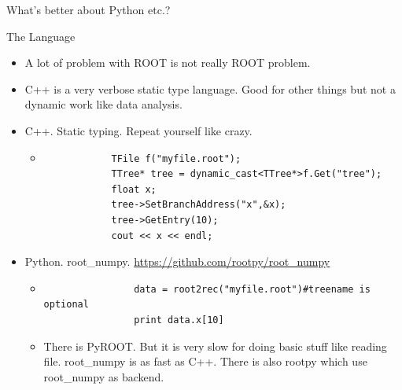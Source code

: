 \documentclass{beamer}
\begin{document}
\begin{frame}[c]
		\centerline{\Large What's better about Python etc.?}
\end{frame}

\begin{frame}[fragile]{The Language}
	\begin{itemize}
	\item A lot of problem with ROOT is not really ROOT problem.
	\item C++ is a very verbose static type language. Good for other things but not a dynamic work like data analysis.
	\item C++. Static typing. Repeat yourself like crazy.
		\begin{itemize}
		\item
		\begin{verbatim}
			TFile f("myfile.root");
			TTree* tree = dynamic_cast<TTree*>f.Get("tree");
			float x;
			tree->SetBranchAddress("x",&x);
			tree->GetEntry(10);
			cout << x << endl;
		\end{verbatim}
		\end{itemize}
	\item Python. root\_numpy. \url{https://github.com/rootpy/root_numpy}
		\begin{itemize}
			\item 
			\begin{verbatim}
				data = root2rec("myfile.root")#treename is optional
				print data.x[10]
			\end{verbatim}
			\item There is PyROOT. But it is very slow for doing basic stuff like reading file. root\_numpy is as fast as C++. There is also rootpy which use root\_numpy as backend.
		\end{itemize}
	\end{itemize}
\end{frame}
\end{document}
